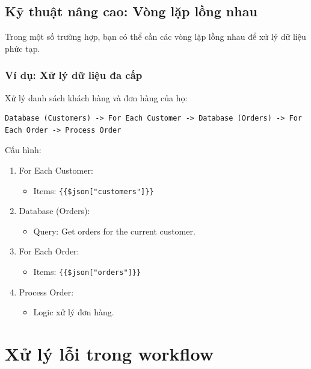 \subsection{Kỹ thuật nâng cao: Vòng lặp lồng nhau}

Trong một số trường hợp, bạn có thể cần các vòng lặp lồng nhau để xử lý dữ liệu phức tạp.

\subsubsection{Ví dụ: Xử lý dữ liệu đa cấp}

Xử lý danh sách khách hàng và đơn hàng của họ:

\begin{verbatim}
Database (Customers) -> For Each Customer -> Database (Orders) -> For Each Order -> Process Order
\end{verbatim}

Cấu hình:
\begin{enumerate}
  \item For Each Customer:
  \begin{itemize}
    \item Items: \texttt{\{\{\$json["customers"]\}\}}
  \end{itemize}
  
  \item Database (Orders):
  \begin{itemize}
    \item Query: Get orders for the current customer.
  \end{itemize}
  
  \item For Each Order:
  \begin{itemize}
    \item Items: \texttt{\{\{\$json["orders"]\}\}}
  \end{itemize}
  
  \item Process Order:
  \begin{itemize}
    \item Logic xử lý đơn hàng.
  \end{itemize}
\end{enumerate}

\section{Xử lý lỗi trong workflow}

